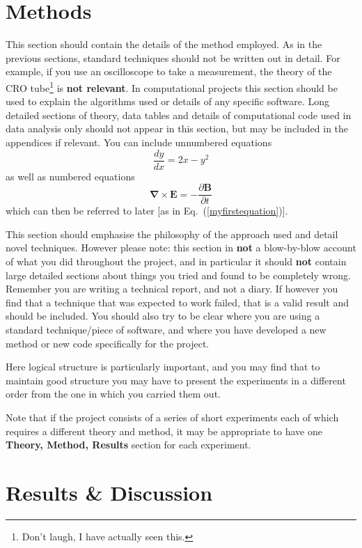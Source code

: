 \documentclass[a4paper,12pt]{article}
\begin{document}
\section{Methods}

This section should contain the details of the method employed. 
As in the previous sections, standard techniques should not be written
out in detail. For example, if you use an oscilloscope to take a
measurement, the theory of the CRO tube\footnote{Don't laugh, I have actually
seen this.} is {\bf not relevant}. In computational projects this
section should be used to explain the algorithms used or details of any specific 
software. Long detailed sections of theory, data tables
and details of computational code used in data analysis only should not
appear in this section, but may be included in the appendices if relevant. You can
include unnumbered equations
\[
\frac{dy}{dx}=2x-y^2
\]
as well as numbered equations
\begin{equation} \label{myfirstequation}
\mathbf{\nabla}\times\mathbf{E} = -\frac{\partial \mathbf{B}}{\partial t}
\end{equation}
which can then be referred to later [as in Eq.~(\ref{myfirstequation})].

This section should emphasise the philosophy of the approach used
and detail novel techniques. However
please note: this section in {\bf not} a blow-by-blow account of what
you did throughout the project, and in particular it should {\bf not} 
contain large detailed sections about things you tried and found to be
completely wrong. Remember you are writing a technical report, and
not a diary. If however you find that a technique that was expected to
work failed, that is a valid result and should be included. You should 
also try to be clear where you are using a standard technique/piece of 
software, and where you have developed a new method or new code specifically 
for the project.

Here logical structure is particularly important, and you may find that
to maintain good structure you may have to present the experiments
in a different order from the one in which you carried them out.

Note that if the project consists of a series of short experiments
each of which requires a different theory and method, it may be appropriate
to have one {\bf Theory, Method, Results} section for each
experiment.


\section{Results \& Discussion}
\end{document}
